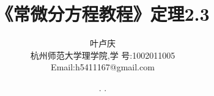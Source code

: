 \documentclass[a4paper, 12pt]{article} %
\makeatletter
\renewcommand{\maketitle}{ %
  \renewcommand\refname{参考文献}
  \newcommand{\D}{\displaystyle}\newcommand{\ri}{\Rightarrow}
  \newcommand{\ds}{\displaystyle} \renewcommand{\ni}{\noindent}
  \newcommand{\pa}{\partial} \newcommand{\Om}{\Omega}
  \newcommand{\om}{\omega} \newcommand{\sik}{\sum_{i=1}^k}
  \newcommand{\vov}{\Vert\omega\Vert} \newcommand{\Umy}{U_{\mu_i,y^i}}
  \newcommand{\lamns}{\lambda_n^{^{\scriptstyle\sigma}}}
  \newcommand{\chiomn}{\chi_{_{\Omega_n}}}
  \newcommand{\ullim}{\underline{\lim}} \newcommand{\bsy}{\boldsymbol}
  \newcommand{\mvb}{\mathversion{bold}} \newcommand{\la}{\lambda}
  \newcommand{\La}{\Lambda} \newcommand{\va}{\varepsilon}
  \newcommand{\be}{\beta} \newcommand{\al}{\alpha}
  \newcommand{\dis}{\displaystyle} \newcommand{\R}{{\mathbb R}}
  \newcommand{\N}{{\mathbb N}} \newcommand{\cF}{{\mathcal F}}
  \newcommand{\gB}{{\mathfrak B}} \newcommand{\eps}{\epsilon}
  \begin{flushright} %
    {\LARGE\@title} %
    
    \vspace{50pt} %
    
    {\large\@author} %
    \\\@date %
    
    \vspace{40pt} %
  \end{flushright}
}
\makeatother
\begin{document}
\begin{CJK}{UTF8}{gkai}
  \title{\textbf{《常微分方程教程》\cite{dinglichang}定理2.3}}
  \setlength{}

  \author{\small{叶卢庆}\\{\small{杭州师范大学理学院,学
        号:1002011005}}\\{\small{Email:h5411167@gmail.com}}} %
  \renewcommand{\today}{\number\year. \number\month. \number\day}
  \date{\today} %
  
  
  
  \maketitle %
  
  
  
  
  
  
  

\end{CJK}
\end{document}
